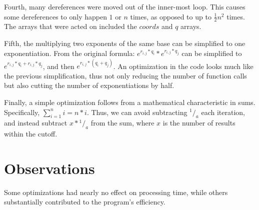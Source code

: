 \documentclass[12pt]{article}
\begin{document}
	Fourth, many dereferences were moved out of the inner-most loop.
	This causes some dereferences to only happen $1$ or $n$ times, as opposed to up to $\frac{1}{2}n^2$ times.
	The arrays that were acted on included the $coords$ and $q$ arrays.

	Fifth, the multiplying two exponents of the same base can be simplified to one exponentiation.
	From the original formula: $e^{r_{i,j}*q_i}*e^{r_{i,j}*q_j}$ can be simplified to $e^{r_{i,j}*q_i+r_{i,j}*q_j}$, and then $e^{r_{i,j}*(q_i+q_j)}$.
	An optimization in the code looks much like the previous simplification, 
	thus not only reducing the number of function calls but also cutting the number of exponentiations by half.

	Finally, a simple optimization follows from a mathematical characteristic in sums. 
	Specifically, $\displaystyle\sum_{i=1}^n{i} = n*i$.
	Thus, we can avoid subtracting $^1/_a$ each iteration, and instead subtract $x*{^1/_a}$ from the sum,
	where $x$ is the number of results within the cutoff.




	\section{Observations}

	Some optimizations had nearly no effect on processing time, while others substantially contributed to the program's efficiency.
\end{document}
